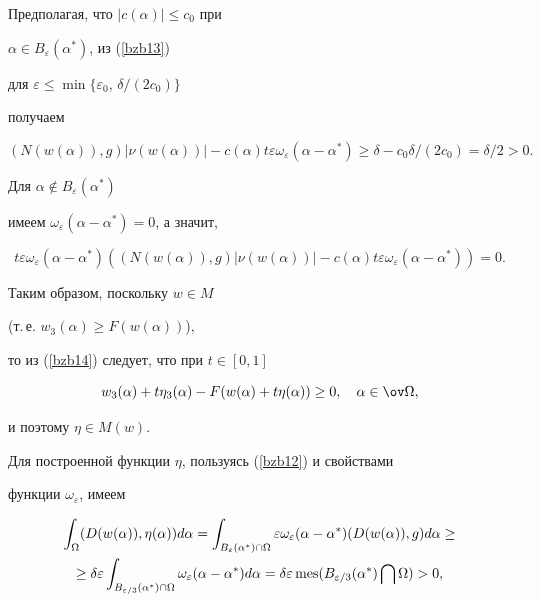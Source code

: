 Предполагая, что $|c(\alpha )| \leq c_0$ при 


$\alpha \in B_{\varepsilon} (\alpha ^*)$, из (\ref{bzb13})


для $\varepsilon \leq \min \{\varepsilon _0$, $\delta / (2 c_0) \}$


получаем


$$


( N(w (\alpha )), g ) |\nu (w(\alpha ))|


- c(\alpha ) t \varepsilon 


\omega _{\varepsilon} (\alpha -\alpha ^*) \geq 


\delta - c_0 \delta / (2 c_0)=\delta / 2 > 0.


$$


Для $\alpha \notin B_{\varepsilon} (\alpha ^*)$


имеем $\omega _{\varepsilon} (\alpha -\alpha ^*)=0$, а значит, 


$$


t \varepsilon \omega _{\varepsilon} (\alpha -\alpha ^*) 


( {( N(w (\alpha )), g ) |\nu (w(\alpha ))|-c(\alpha ) t \varepsilon 


\omega _{\varepsilon} (\alpha -\alpha ^*)} )=0.


$$


Таким образом, поскольку $w \in M$


(т.\,е. $w_3(\alpha ) \geq F(w(\alpha ))$),


то из (\ref{bzb14}) следует, что при $t \in [0,1]$


$$


w_3 (\alpha )+t \eta_3(\alpha ) - F(w (\alpha )+t \eta(\alpha )) \geq 0,


\quad \alpha \in \ov\Omega,


$$


и поэтому $\eta \in M(w)$.


Для построенной функции $\eta$, пользуясь (\ref{bzb12}) и свойствами


функции $\omega _{\varepsilon}$, имеем


\begin{multline}


\int_\Omega ( {D (w(\alpha )), \eta (\alpha )} ) d \alpha=


\int_{B_{\varepsilon} (\alpha ^*) \cap \Omega} 


\varepsilon \omega _{\varepsilon} (\alpha -\alpha ^*)


( D (w(\alpha )), g ) d \alpha \geq \\


%


\geq \delta \varepsilon \int_{B_{\varepsilon / 3}(\alpha ^*) \cap \Omega} 


\omega _{\varepsilon} (\alpha -\alpha ^*) d\alpha=


\delta \varepsilon \mes (B_{\varepsilon / 3} (\alpha ^*) \bigcap \Omega )>0,


\label{bzb14_1}


\end{multline}


